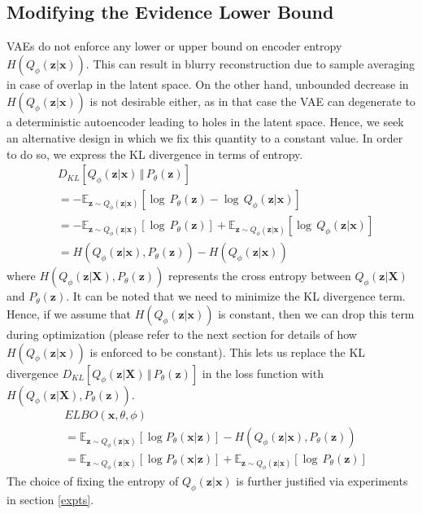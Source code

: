 \documentclass[letterpaper]{article} %
\begin{document}
\subsection{Modifying the Evidence Lower Bound}
VAEs do not enforce any lower or upper bound on encoder entropy $H(Q_\phi(\mathbf{z}|\mathbf{x}))$. This can result in blurry reconstruction due to sample averaging in case of overlap in the latent space. On the other hand, unbounded decrease in $H(Q_\phi(\mathbf{z}|\mathbf{x}))$ is not desirable either, as in that case the VAE can degenerate to a deterministic autoencoder leading to holes in the latent space. Hence, we seek an alternative design in which we fix this quantity to a constant value. In order to do so, we express the KL divergence in terms of entropy.
\begin{equation}
\begin{split}
&D_{\mathit{KL}}[Q_{\phi}(\mathbf{z}|\mathbf{x}) \, \Vert \, P_{\theta}(\mathbf{z})] \\
&= -\mathbb{E}_{\mathbf{z} \sim Q_{\phi}(\mathbf{z} \vert \mathbf{x})}\left[\log \, P_{\theta}(\mathbf{z}) - \log \, Q_{\phi}(\mathbf{z} \vert \mathbf{x}) \right] \\
&= -\mathbb{E}_{\mathbf{z} \sim Q_{\phi}(\mathbf{z} \vert \mathbf{x})}\left[\log \, P_{\theta}(\mathbf{z}) \right] + \mathbb{E}_{\mathbf{z} \sim Q_{\phi}(\mathbf{z} \vert \mathbf{x})}\left[\log \, Q_{\phi}(\mathbf{z} \vert \mathbf{x}) \right] \\
&= H(Q_{\phi}(\mathbf{z} \vert \mathbf{x}), P_{\theta}(\mathbf{z})) - H(Q_{\phi}(\mathbf{z} \vert \mathbf{x}))
\end{split}
\label{kl_div_eq}
\end{equation}
where $H(Q_{\phi}(\mathbf{z} \vert \mathbf{X}), P_{\theta}(\mathbf{z}))$ represents the cross entropy between $Q_{\phi}(\mathbf{z}|\mathbf{X})$ and $P_{\theta}(\mathbf{z})$. It can be noted that we need to minimize the KL divergence term. Hence, if we assume that $H(Q_{\phi}(\mathbf{z} \vert \mathbf{x}))$ is constant, then we can drop this term during optimization (please refer to the next section for details of how $H(Q_{\phi}(\mathbf{z} \vert \mathbf{x}))$ is enforced to be constant). This lets us replace the KL divergence $D_{\mathit{KL}}[Q_{\phi}(\mathbf{z}|\mathbf{X}) \, \Vert \, P_{\theta}(\mathbf{z})]$ in the loss function with $H(Q_{\phi}(\mathbf{z} \vert \mathbf{X}), P_{\theta}(\mathbf{z}))$.
\begin{equation}
\begin{split}
&ELBO(\mathbf{x},\theta,\phi) \\
&= \mathbb{E}_{\mathbf{z}\sim Q_{\phi}(\mathbf{z}|\mathbf{x})}[\log P_\theta(\mathbf{x}|\mathbf{z})]
- H(Q_{\phi}(\mathbf{z} \vert \mathbf{x}), P_{\theta}(\mathbf{z})) \\
&= \mathbb{E}_{\mathbf{z}\sim Q_{\phi}(\mathbf{z}|\mathbf{x})}[\log P_\theta(\mathbf{x}|\mathbf{z})]
 + \mathbb{E}_{\mathbf{z} \sim Q_{\phi}(\mathbf{z} \vert \mathbf{x})}\left[\log \, P_{\theta}(\mathbf{z}) \right]
\end{split}
\label{kl_div_eqival}
\end{equation}
The choice of fixing the entropy of $Q_{\phi}(\mathbf{z} \vert \mathbf{x})$ is further justified via experiments in section \ref{expts}.
\end{document}
